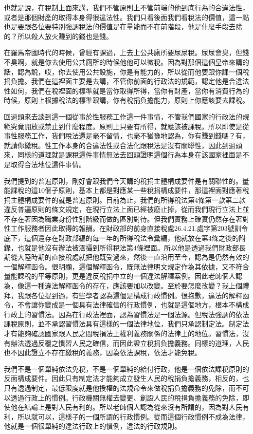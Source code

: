 \documentclass[oneside,sub3section]{ctexbook}
\begin{document}
也就是說，在稅制上面來講，我們不管原則上不管前端的他到底行為的合違法性，或者是那個財產的取得本身得很違法性。我們只看後面我們看稅法的價值，這一點也是要跟各位要特別強調稅法的價值是在量能而不在前階段，他是什麼手段去除的？所以殺人放火賺到的錢也是錢。

在羅馬帝國時代的時候，曾經有課過，上去上公共廁所要尿尿稅。尿尿會臭，但錢不臭啊，就是你去使用公共廁所的時候他他可以徵稅。因為對那個這個皇帝來講的話，認為說，哎，你去使用公共設施，你是有能力的，所以從而他要跟你課一個稅捐負擔。我們在這裡面主要是去講，不管你前面的行政法的規範，認定他是合違法性如何，我們在稅裡面的標準就是當你取得所得，當你有財產，當你有消費行為的時候，原則上根據稅法的標準跟講，你有稅捐負擔能力，原則上你應該要去課稅。

回過頭來去談到這一個從事於性服務工作這一件事情，不管我們國家的行政法的規範究竟開放或禁止到什麼程度。原則上只要有所得，就應該被課稅。所以即使是從事性服務工作，我們稅法還是毫不留情，也毫不猶豫地認為，你有賺到錢嗎？有，就請你繳稅。性工作本身的合違法性或合法化跟稅法是沒有關聯性，因此到過頭來，同樣的道理就是課稅這件事情無法去回頭證明這個行為本身在該國家裡面是不是取得合法地位這件事情。

我們提到的普遍原則，剛好會跟我們今天講的稅捐主體構成要件是有關聯性的。量能課稅的這10個子原則，基本上都是對應某一些稅捐構成要件，那這裡面對應著稅捐主體構成要件的就是普遍原則。目前為止，我們的所得稅法第4條第一款第二款違反普遍原則的條文規定，在現行立法上面已經被廢止掉，從而我們現行立法上並不存在著因為職業身份性別階級而做的區別對待。但我們實務上確實仍然存在著對性工作服務者因此取得的報酬。在財政部的前身直接稅處26.4.21.處字第203號訓令底下，這個還存在財政部編的每一年的所得稅法令彙編，他就放在第4條之後的附錄，也就是他沒有辦法被涵攝到所得稅法第4條裡面。所以他是透過我們財政部長期從大陸時期的直接稅處就把他既受過來，然後一直沿用至今，認為是仍然有效的一個解釋函令。很明顯，這個解釋函令，既無法律明文規定作為其依據，又不符合量能課稅的平等原則，更是違反稅捐中立的一個違法解釋案例。因此老師個人認為，像這一種違法解釋函令的存在，應該要加以改變。至於要怎麼改變？我上個禮拜，我跟各位提到過，有些學者認為這個是構成行政慣例。很抱歉，違法的解釋函令，不會讓你變成是一個具有法律確信的行政慣例，也就是這個地方，根本不構成行政上的習慣法。因為在行政法裡面，認為習慣法是一個法源。但稅法強調的依法課稅原則，並不承認習慣法具有這樣的一個法律地位，我們只承認制定法。制定法才有能夠確認國家跟人民之間稅捐法上權利義務關係的法律上的地位。習慣法，沒有辦法透過反覆之慣習人民之確信，而因此證立稅捐負擔義務。同樣的道理，人民也不因此證立不存在繳稅的義務，因為依法課稅，依法才能免稅。

我們不是一個單純依法免稅，不是一個單純的給付行政，他是一個依法課稅原則的反面構成要件。因此只有制定法才能夠成立發生人民的稅捐負擔義務，相反的，也只有透過制定，最低限度就是他授權的法規命令來做稅捐負擔義務的免除，而不可以透過行政上的慣例。行政機關無權去變更、創設人民的稅捐負擔義務的免除，即使他在結論上是對人民有利的。所以老師個人認為從來沒有所謂的，因為對人民有利，所以就可以，這樣子的一個所謂的行政慣例。從而這個行政慣例不成為法律，他就是一個很單純的違法行政上的慣例，違法的行政規則。
\end{document}
